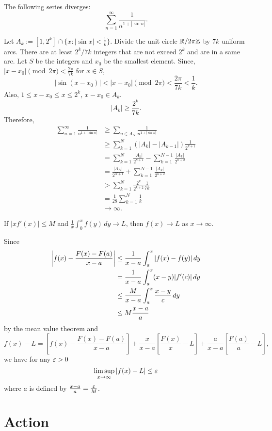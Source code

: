 \documentclass{article}
\let\realsection\section
\renewcommand\section{\newpage\realsection}
\begin{document}
\begin{thm}
The following series diverges: \[\sum_{n=1}^\infty\frac1{n^{1+|\sin n|}}.\]
\end{thm}
\begin{pf}
Let $A_k:=[1,2^k]\cap\{x:|\sin x|<\frac1k\}$.
Divide the unit circle $\mathbb{R}/2\pi\mathbb{Z}$ by $7k$ uniform arcs.
There are at least $2^k/7k$ integers that are not exceed $2^k$ and are in a same arc.
Let $S$ be the integers and $x_0$ be the smallest element.
Since, $|x-x_0|\pmod{2\pi}<\frac{2\pi}{7k}$ for $x\in S$,
\[|\sin(x-x_0)|<|x-x_0|\pmod{2\pi}<\frac{2\pi}{7k}<\frac1k.\]
Also, $1\le x-x_0\le x\le2^k$, $x-x_0\in A_k$.
\[|A_k|\ge\frac{2^k}{7k}.\]
Therefore,
\begin{align*}
\sum_{n=1}^\infty\frac1{n^{1+|\sin n|}}
&\ge\sum_{n\in A_N}\frac1{n^{1+|\sin n|}}\\
&\ge\sum_{k=1}^N(|A_k|-|A_{k-1}|)\frac1{2^{k+1}}\\
&=\sum_{k=1}^N\frac{|A_k|}{2^{k+1}}-\sum_{k=1}^{N-1}\frac{|A_k|}{2^{k+2}}\\
&=\frac{|A_N|}{2^{N+1}}+\sum_{k=1}^{N-1}\frac{|A_k|}{2^{k+2}}\\
&>\sum_{k=1}^N\frac{2^k}{2^{k+2}}\frac1{7k}\\
&=\frac1{28}\sum_{k=1}^N\frac1k\\
&\to\infty.
\end{align*}
\end{pf}

\begin{thm}
If $|xf'(x)|\le M$ and $\frac1x\int_0^xf(y)\,dy\to L$, then $f(x)\to L$ as $x\to\infty$.
\end{thm}
\begin{pf}
Since
\begin{align*}
\left\lvert f(x)-\frac{F(x)-F(a)}{x-a}\right\rvert
&\le\frac1{x-a}\int_a^x|f(x)-f(y)|\,dy\\
&=\frac1{x-a}\int_a^x(x-y)|f'(c)|\,dy\\
&\le\frac M{x-a}\int_a^x\frac{x-y}c\,dy\\
&\le M\frac{x-a}a
\end{align*}
by the mean value theorem and 
\[f(x)-L=\left[f(x)-\frac{F(x)-F(a)}{x-a}\right]+\frac x{x-a}\left[\frac{F(x)}x-L\right]+\frac a{x-a}\left[\frac{F(a)}a-L\right],\]
we have for any $\varepsilon>0$
\[\limsup_{x\to\infty}|f(x)-L|\le\e\]
where $a$ is defined by $\frac{x-a}a=\frac{\varepsilon} M$.
\end{pf}


\section{Action}
\end{document}
